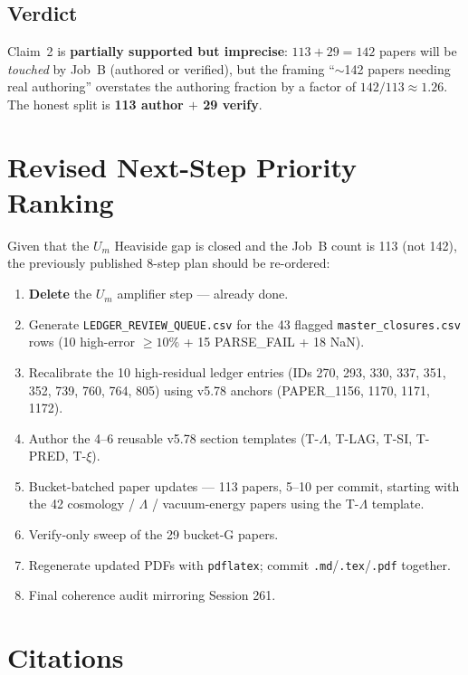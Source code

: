\documentclass[11pt]{article}
\begin{document}
\subsection{Verdict}

Claim~2 is \textbf{partially supported but imprecise}:
$113+29=142$ papers will be \emph{touched} by Job~B
(authored or verified), but the framing
``$\sim$142 papers needing real authoring'' overstates the
authoring fraction by a factor of $142/113\approx 1.26$.
The honest split is \textbf{113 author $+$ 29 verify}.

\section{Revised Next-Step Priority Ranking}

Given that the $U_m$ Heaviside gap is closed and the Job~B count
is 113 (not 142), the previously published 8-step plan should be
re-ordered:

\begin{enumerate}
\item \textbf{Delete} the $U_m$ amplifier step --- already done.
\item Generate \verb|LEDGER_REVIEW_QUEUE.csv| for the 43 flagged
      \verb|master_closures.csv| rows (10 high-error $\ge 10\%$ +
      15 PARSE\_FAIL + 18 NaN).
\item Recalibrate the 10 high-residual ledger entries
      (IDs 270, 293, 330, 337, 351, 352, 739, 760, 764, 805) using
      v5.78 anchors (PAPER\_1156, 1170, 1171, 1172).
\item Author the 4--6 reusable v5.78 section templates
      (T-$\Lambda$, T-LAG, T-SI, T-PRED, T-$\xi$).
\item Bucket-batched paper updates --- 113 papers, 5--10 per
      commit, starting with the 42 cosmology / $\Lambda$ /
      vacuum-energy papers using the T-$\Lambda$ template.
\item Verify-only sweep of the 29 bucket-G papers.
\item Regenerate updated PDFs with \verb|pdflatex|;
      commit \verb|.md|/\verb|.tex|/\verb|.pdf| together.
\item Final coherence audit mirroring Session 261.
\end{enumerate}

\section{Citations}
\end{document}
